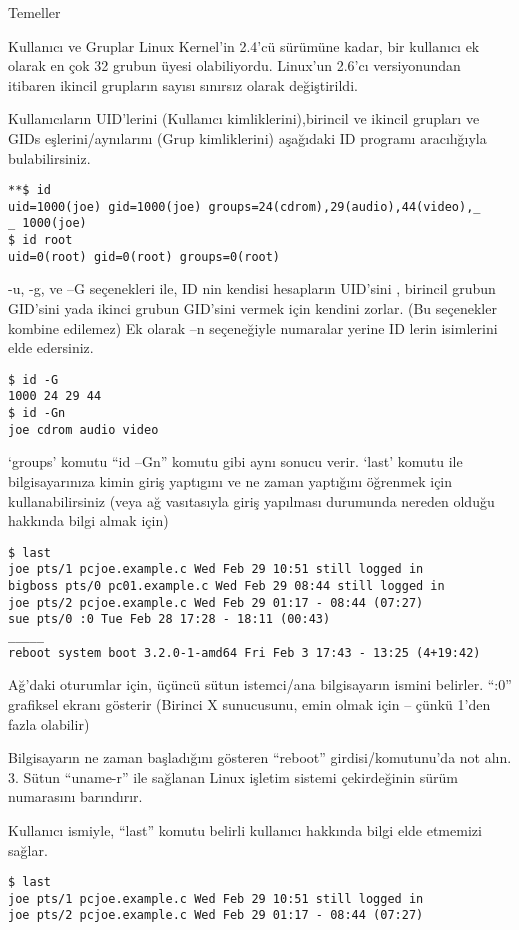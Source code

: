 \begin{section}{Temeller}
\begin{subsection}{Kullanıcı ve Gruplar}
Linux Kernel’in 2.4’cü sürümüne kadar, bir kullanıcı ek olarak en çok 32 grubun üyesi olabiliyordu. Linux’un 2.6’cı versiyonundan itibaren ikincil grupların sayısı sınırsız olarak değiştirildi.

Kullanıcıların UID’lerini (Kullanıcı kimliklerini),birincil ve ikincil grupları ve GIDs eşlerini/aynılarını (Grup kimliklerini) aşağıdaki ID programı aracılığıyla bulabilirsiniz.
\begin{verbatim}
**$ id
uid=1000(joe) gid=1000(joe) groups=24(cdrom),29(audio),44(video),_
_ 1000(joe)
$ id root
uid=0(root) gid=0(root) groups=0(root)
\end{verbatim}

-u, -g, ve –G seçenekleri ile, ID nin kendisi hesapların UID’sini , birincil grubun GID’sini yada ikinci grubun GID’sini vermek için kendini zorlar. (Bu seçenekler kombine edilemez) Ek olarak –n seçeneğiyle numaralar yerine ID lerin isimlerini elde edersiniz.
\begin{verbatim}
$ id -G
1000 24 29 44
$ id -Gn
joe cdrom audio video
\end{verbatim}

‘groups’ komutu “id –Gn” komutu gibi aynı sonucu verir. ‘last’ komutu ile bilgisayarınıza kimin giriş yaptıgını ve ne zaman yaptığını öğrenmek için kullanabilirsiniz (veya ağ vasıtasıyla giriş yapılması durumunda nereden olduğu hakkında bilgi almak için)
\begin{verbatim}
$ last
joe pts/1 pcjoe.example.c Wed Feb 29 10:51 still logged in
bigboss pts/0 pc01.example.c Wed Feb 29 08:44 still logged in
joe pts/2 pcjoe.example.c Wed Feb 29 01:17 - 08:44 (07:27)
sue pts/0 :0 Tue Feb 28 17:28 - 18:11 (00:43)
_____
reboot system boot 3.2.0-1-amd64 Fri Feb 3 17:43 - 13:25 (4+19:42)
\end{verbatim}

Ağ’daki oturumlar için, üçüncü sütun istemci/ana bilgisayarın ismini belirler. “:0” grafiksel ekranı gösterir (Birinci X sunucusunu, emin olmak için – çünkü 1’den fazla olabilir)

Bilgisayarın ne zaman başladığını gösteren “reboot” girdisi/komutunu’da not alın. 3. Sütun “uname-r” ile sağlanan Linux işletim sistemi çekirdeğinin sürüm numarasını barındırır.

Kullanıcı ismiyle, “last” komutu belirli kullanıcı hakkında bilgi elde etmemizi sağlar.
\begin{verbatim}
$ last
joe pts/1 pcjoe.example.c Wed Feb 29 10:51 still logged in
joe pts/2 pcjoe.example.c Wed Feb 29 01:17 - 08:44 (07:27)
\end{verbatim}


\end{subsection}
\end{section}
